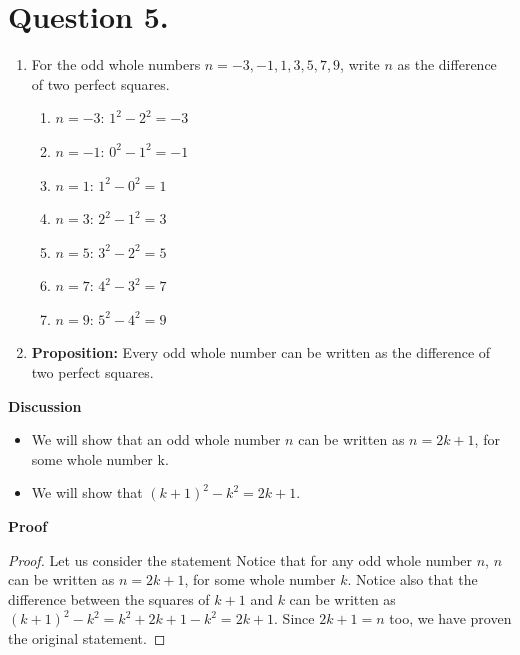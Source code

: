 \documentclass{article}
\begin{document}
    \section*{Question 5.}

    \renewcommand{\labelenumi}{(\alph{enumi})}
    \renewcommand{\labelenumii}{\arabic{enumii}.}
    \begin{enumerate}
        \item For the odd whole numbers $ n = -3, -1, 1, 3, 5, 7, 9 $, write $ n $ as the difference of two perfect squares.
        \begin{enumerate}
            \item $ n = -3 $: $ 1^2 - 2^2 = -3 $
            \item $ n = -1 $: $ 0^2 - 1^2 = -1 $
            \item $ n = 1 $: $ 1^2 - 0^2 = 1 $
            \item $ n = 3 $: $ 2^2 - 1^2 = 3 $
            \item $ n = 5 $: $ 3^2 - 2^2 = 5 $
            \item $ n = 7 $: $ 4^2 - 3^2 = 7 $
            \item $ n = 9 $: $ 5^2 - 4^2 = 9 $
        \end{enumerate}
        \item \textbf{Proposition:} Every odd whole number can be written as the difference of two perfect squares.
    \end{enumerate}

    \begin{adjustwidth}{6ex}{}
        
        \textbf{Discussion}
        \begin{itemize}
            \item We will show that an odd whole number $ n $ can be written as $ n = 2k + 1 $, for some whole number k.
            \item We will show that $ (k + 1)^2 - k^2 = 2k + 1 $.
        \end{itemize}
        
        \noindent \textbf{Proof}
        \begin{proof}
            Let us consider the statement  Notice that for any odd whole number $ n $, $ n $ can be written as $ n = 2k + 1 $, for some whole number $ k $. Notice also that
            the difference between the squares of $ k + 1 $ and $ k $ can be written as $ (k + 1)^2 - k^2 = k^2 + 2k + 1 - k^2 = 2k + 1 $. Since $ 2k + 1 = n $ too, we have proven the original statement.
        \end{proof}
    \end{adjustwidth}
\end{document}
